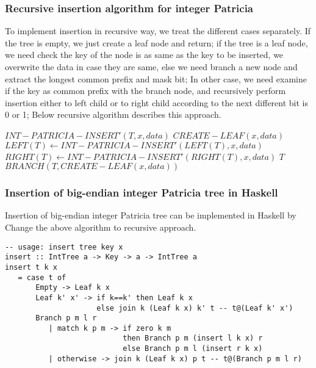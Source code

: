 \documentclass{article}
\begin{document}
\subsubsection{Recursive insertion algorithm for integer Patricia}

To implement insertion in recursive way, we treat the different cases
separately. If the tree is empty, we just create a leaf node and
return; if the tree is a leaf node, we need check the key of the
node is as same as the key to be inserted, we overwrite the data in
case they are same, else we need branch a new node and extract the
longest common prefix and mask bit; In other case, we need examine if
the key as common prefix with the branch node, and recursively perform
insertion either to left child or to right child according to the next
different bit is 0 or 1; Below recursive algorithm describes this approach.

\begin{algorithmic}
\STATE $INT-PATRICIA-INSERT'(T, x, data)$
   \RETURN $CREATE-LEAF(x, data)$
     \STATE $LEFT(T) \leftarrow INT-PATRICIA-INSERT'(LEFT(T), x, data)$
   \ELSE
     \STATE $RIGHT(T) \leftarrow INT-PATRICIA-INSERT'(RIGHT(T), x, data)$
   \ENDIF
   \RETURN $T$
\ELSE
   \RETURN $BRANCH(T, CREATE-LEAF(x, data))$
\ENDIF
\end{algorithmic}

\subsubsection*{Insertion of big-endian integer Patricia tree in Haskell}
Insertion of big-endian integer Patricia tree can be implemented in Haskell
by Change the above algorithm to recursive approach.

\lstset{language=Haskell}
\begin{lstlisting}
-- usage: insert tree key x
insert :: IntTree a -> Key -> a -> IntTree a
insert t k x 
   = case t of
       Empty -> Leaf k x
       Leaf k' x' -> if k==k' then Leaf k x
                     else join k (Leaf k x) k' t -- t@(Leaf k' x')
       Branch p m l r
          | match k p m -> if zero k m
                           then Branch p m (insert l k x) r
                           else Branch p m l (insert r k x)
          | otherwise -> join k (Leaf k x) p t -- t@(Branch p m l r)
\end{lstlisting}
\end{document}
